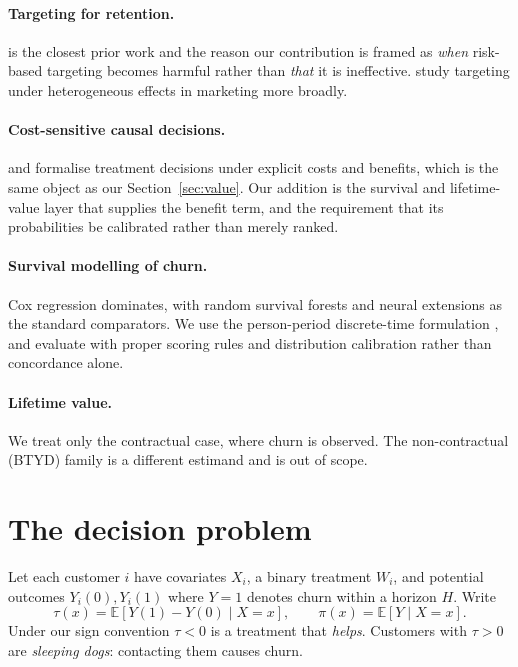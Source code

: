 \documentclass[11pt,a4paper]{article}
\newcommand{\CATE}{\tau}
\begin{document}
\paragraph{Targeting for retention.} \citet{ascarza2018} is the closest prior work
and the reason our contribution is framed as \emph{when} risk-based targeting
becomes harmful rather than \emph{that} it is ineffective. \citet{hitsch2018} study
targeting under heterogeneous effects in marketing more broadly.

\paragraph{Cost-sensitive causal decisions.} \citet{verbeke2023} and
\citet{devriendt2021} formalise treatment decisions under explicit costs and
benefits, which is the same object as our Section~\ref{sec:value}. Our addition is
the survival and lifetime-value layer that supplies the benefit term, and the
requirement that its probabilities be calibrated rather than merely ranked.

\paragraph{Survival modelling of churn.} Cox regression \citep{cox1972} dominates,
with random survival forests \citep{ishwaran2008} and neural extensions
\citep{katzman2018} as the standard comparators. We use the person-period
discrete-time formulation \citep{singer1993}, and evaluate with proper scoring
rules \citep{graf1999} and distribution calibration \citep{haider2020} rather than
concordance alone.

\paragraph{Lifetime value.} We treat only the contractual case, where churn is
observed. The non-contractual (BTYD) family \citep{fader2005} is a different
estimand and is out of scope.

\section{The decision problem}
\label{sec:problem}

Let each customer $i$ have covariates $X_i$, a binary treatment $W_i$, and potential
outcomes $Y_i(0), Y_i(1)$ where $Y=1$ denotes churn within a horizon $H$. Write
\[
  \CATE(x) = \mathbb{E}[Y(1) - Y(0) \mid X = x], \qquad
  \pi(x)   = \mathbb{E}[Y \mid X = x].
\]
Under our sign convention $\CATE < 0$ is a treatment that \emph{helps}. Customers
with $\CATE > 0$ are \emph{sleeping dogs}: contacting them causes churn.
\end{document}
